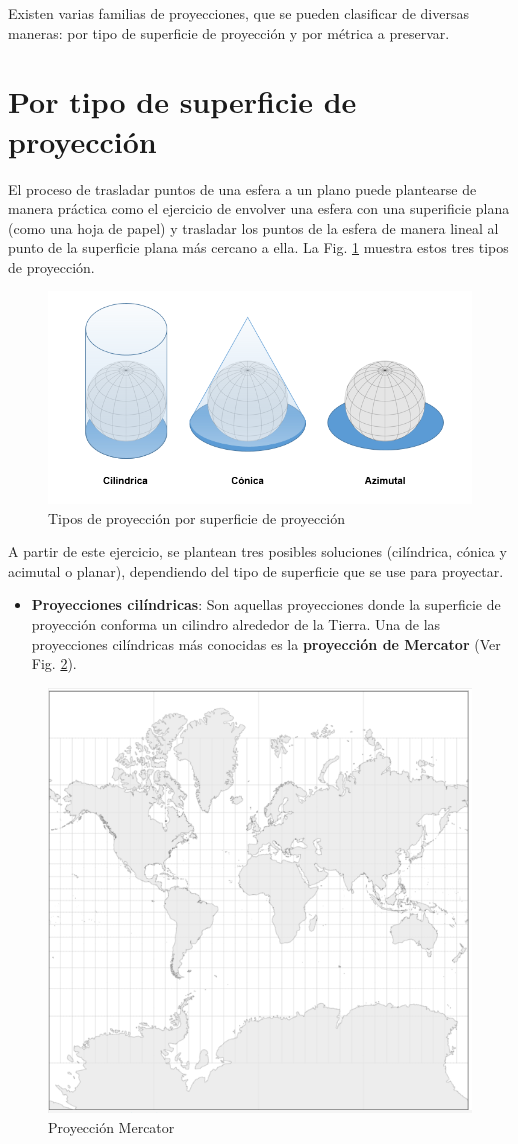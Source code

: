 \documentclass[
]{report}
\providecommand{\tightlist}{%
  \setlength{\itemsep}{0pt}\setlength{\parskip}{0pt}}
\theoremstyle{definition}
\theoremstyle{definition}
\theoremstyle{definition}
\theoremstyle{definition}
\theoremstyle{remark}
\begin{document}
Existen varias familias de proyecciones, que se pueden clasificar de diversas
maneras: por tipo de superficie de proyección y por métrica a preservar.

\hypertarget{por-tipo-de-superficie-de-proyecciuxf3n}{%
\section{Por tipo de superficie de proyección}\label{por-tipo-de-superficie-de-proyecciuxf3n}}

El proceso de trasladar puntos de una esfera a un plano puede plantearse de
manera práctica como el ejercicio de envolver una esfera con una superificie
plana (como una hoja de papel) y trasladar los puntos de la esfera de manera
lineal al punto de la superficie plana más cercano a ella. La Fig.
\ref{fig:fi-proys} muestra estos tres tipos de proyección.

\begin{figure}

{\centering \includegraphics[width=0.6\linewidth]{img/tipos_proy} 

}

\caption{Tipos de proyección por superficie de proyección}\label{fig:fi-proys}
\end{figure}

A partir de este ejercicio, se plantean tres posibles soluciones (cilíndrica,
cónica y acimutal o planar), dependiendo del tipo de superficie que se use para
proyectar.

\begin{itemize}
\tightlist
\item
  \textbf{Proyecciones cilíndricas}: Son aquellas proyecciones donde la superficie
  de proyección conforma un cilindro alrededor de la Tierra. Una de las
  proyecciones cilíndricas más conocidas es la \textbf{proyección de Mercator} (Ver
  Fig. \ref{fig:mercator}).
\end{itemize}

\begin{figure}

{\centering \includegraphics[width=0.4\linewidth]{img/mercator} 

}

\caption{Proyección Mercator}\label{fig:mercator}
\end{figure}
\end{document}
